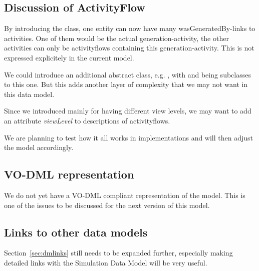 

\subsection{Discussion of ActivityFlow}
By introducing the  class, one entity can now have many 
wasGeneratedBy-links to activities. One of them would be the actual generation-activity, 
the other activities can only be activityflows containing this generation-activity.
This is not expressed explicitely in the current model. 

We could introduce an additional abstract class, e.g. , with  and 
 being subclasses to this one. But this adds another layer of complexity 
that we may not want in this data model.

Since we introduced  mainly for having different view levels, 
we may want to add an attribute \emph{viewLevel} to descriptions of activityflows.

We are planning to test how it all works in implementations and will then adjust the model 
accordingly.

\subsection{VO-DML representation}
We do not yet have a VO-DML compliant representation of the model. This is one 
of the issues to be discussed for the next version of this model.

\subsection{Links to other data models}
Section~\ref{sec:dmlinks} still needs to be expanded further, especially making detailed links with the 
Simulation Data Model will be very useful.
